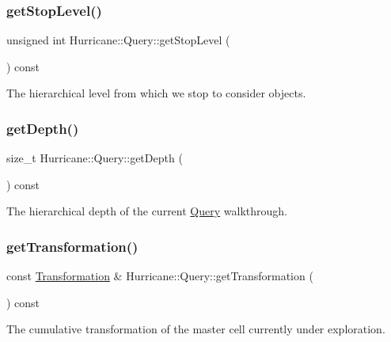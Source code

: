 \subsubsection{\texorpdfstring{get\+Stop\+Level()}{getStopLevel()}}
{\footnotesize\ttfamily unsigned int Hurricane\+::\+Query\+::get\+Stop\+Level (\begin{DoxyParamCaption}{ }\end{DoxyParamCaption}) const\hspace{0.3cm}{\ttfamily [inline]}}

The hierarchical level from which we stop to consider objects. \mbox{\label{classHurricane_1_1Query_afb81080617e5b4d3c2bedf1bf8b2ebd8}} 
\subsubsection{\texorpdfstring{get\+Depth()}{getDepth()}}
{\footnotesize\ttfamily size\+\_\+t Hurricane\+::\+Query\+::get\+Depth (\begin{DoxyParamCaption}{ }\end{DoxyParamCaption}) const\hspace{0.3cm}{\ttfamily [inline]}}

The hierarchical depth of the current \hyperlink{classHurricane_1_1Query}{Query} walkthrough. \mbox{\label{classHurricane_1_1Query_aabe2c0588f95c30a3acfec8fed269be4}} 
\subsubsection{\texorpdfstring{get\+Transformation()}{getTransformation()}}
{\footnotesize\ttfamily const \hyperlink{classHurricane_1_1Transformation}{Transformation} \& Hurricane\+::\+Query\+::get\+Transformation (\begin{DoxyParamCaption}{ }\end{DoxyParamCaption}) const\hspace{0.3cm}{\ttfamily [inline]}}

The cumulative transformation of the master cell currently under exploration. 

